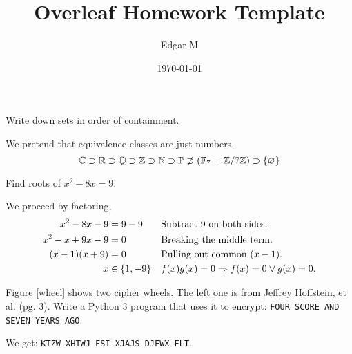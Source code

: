 \documentclass{homework}
\author{Edgar M}
\date{\today}
\title{Overleaf Homework Template}
\begin{document}
 \maketitle

\question[Cosa] Write down sets in order of containment.

We pretend that equivalence classes are just numbers.
\[
	\C \supset \R \supset \Q \supset \Z \supset \N \supset
	\P \not\supset (\GF[7] = \modulo[7])  \supset \{\nil\}
\]

\question Find roots of $x^2- 8x = 9$.

We proceed by factoring,
\begin{align*}
	x^2- 8x - 9     & = 9-9         &  & \text{Subtract 9 on both sides.}         \\
	x^2- x + 9x - 9 & = 0           &  & \text{Breaking the middle term.}         \\
	(x - 1)(x + 9)  & = 0           &  & \text{Pulling out common } (x - 1).      \\
	x               & \in \{1, -9\} &  & f(x)g(x) = 0 \Ra f(x) = 0 \vee g(x) = 0. \\
\end{align*}


\question Figure \ref{wheel} shows two cipher wheels. The left one is from Jeffrey Hoffstein, et al. \cite{hoffstein2008introduction} (pg. 3). Write a Python 3 program that uses it to encrypt: \texttt{FOUR SCORE AND SEVEN YEARS AGO}.



We get: \texttt{KTZW XHTWJ FSI XJAJS DJFWX FLT}.



\end{document}

